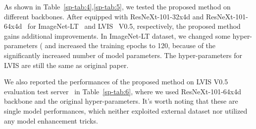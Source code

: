 \documentclass{article}
\begin{document}
As shown in Table~\ref{sp-tab:4},\ref{sp-tab:5}, we tested the proposed method on different backbones. After equipped with ResNeXt-101-32x4d and ResNeXt-101-64x4d~\cite{xie2017aggregated} for ImageNet-LT~\cite{liu2019large} and LVIS~\cite{gupta2019lvis} V0.5, respectively, the proposed method gains additional improvements. In ImageNet-LT dataset, we changed some hyper-parameters ( and increased the training epochs to 120, because of the significantly increased number of model parameters. The hyper-parameters for LVIS are still the same as original paper.

We also reported the performances of the proposed method on LVIS V0.5 evaluation test server~\cite{LVISeval} in Table~\ref{sp-tab:6}, where we used ResNeXt-101-64x4d backbone and the original hyper-parameters. It's worth noting that these are single model performances, which neither exploited external dataset nor utilized any model enhancement tricks.


\small

  

\end{document}
